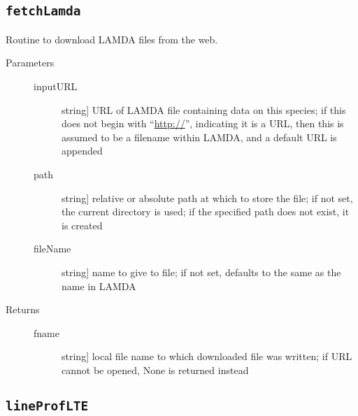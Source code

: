 \documentclass[letterpaper,10pt,english]{sphinxmanual}
\begin{document}
\subsection{\texttt{fetchLamda}}
\label{fulldoc:fetchlamda}

\begin{fulllineitems}
\label{fulldoc:despotic.fetchLamda}
Routine to download LAMDA files from the web.
\begin{description}
\item[{Parameters}] \leavevmode\begin{description}
\item[{inputURL}] \leavevmode{[}string{]}
URL of LAMDA file containing data on this species; if this
does not begin with ``\href{http://}{http://}'', indicating it is a URL, then
this is assumed to be a filename within LAMDA, and a default
URL is appended

\item[{path}] \leavevmode{[}string{]}
relative or absolute path at which to store the file; if not
set, the current directory is used; if the specified path does
not exist, it is created

\item[{fileName}] \leavevmode{[}string{]}
name to give to file; if not set, defaults to the same as the
name in LAMDA

\end{description}

\item[{Returns}] \leavevmode\begin{description}
\item[{fname}] \leavevmode{[}string{]}
local file name to which downloaded file was written; if URL
cannot be opened, None is returned instead

\end{description}

\end{description}

\end{fulllineitems}



\subsection{\texttt{lineProfLTE}}
\label{fulldoc:sssec-full-lineproflte}\label{fulldoc:lineproflte}
\end{document}

